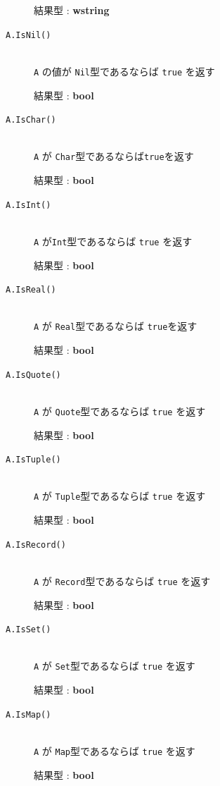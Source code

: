 \documentclass[\pformat,12pt]{jarticle}
\begin{document}
\begin{description}
     結果型 : {\bf wstring}
     
\item[{\tt A.IsNil()}] \mbox{}\\
     {\tt A} の値が {\tt Nil}型であるならば {\tt true} を返す

     結果型 : {\bf bool}
     
\item[{\tt A.IsChar()}] \mbox{}\\
     {\tt A} が {\tt Char}型であるならば{\tt true}を返す

     結果型 : {\bf bool}

\item[{\tt A.IsInt()}] \mbox{}\\
      {\tt A} が{\tt Int}型であるならば {\tt true} を返す

     結果型 : {\bf bool}

\item[{\tt A.IsReal()}] \mbox{}\\
      {\tt A} が {\tt Real}型であるならば {\tt true}を返す

     結果型 : {\bf bool}

\item[{\tt A.IsQuote()}] \mbox{}\\
      {\tt A} が {\tt Quote}型であるならば {\tt true} を返す

     結果型 : {\bf bool}

\item[{\tt A.IsTuple()}] \mbox{}\\
      {\tt A} が {\tt Tuple}型であるならば {\tt true} を返す

     結果型 : {\bf bool}

\item[{\tt A.IsRecord()}] \mbox{}\\
     {\tt A} が {\tt Record}型であるならば {\tt true} を返す

     結果型 : {\bf bool}

\item[{\tt A.IsSet()}] \mbox{}\\
     {\tt A} が {\tt Set}型であるならば {\tt true} を返す

     結果型 : {\bf bool}

\item[{\tt A.IsMap()}] \mbox{}\\
     {\tt A} が {\tt Map}型であるならば {\tt true} を返す

     結果型 : {\bf bool}


\end{description}
\end{document}
